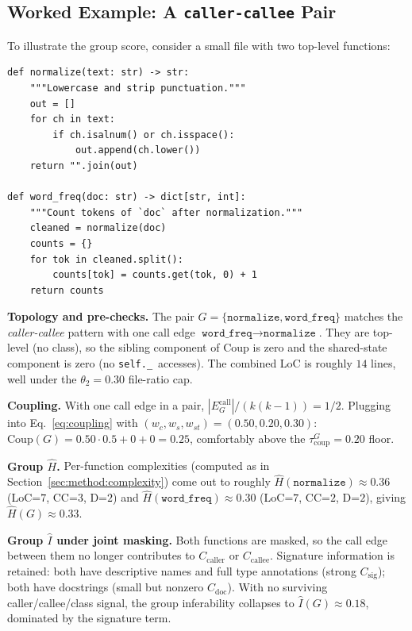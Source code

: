 \subsection{Worked Example: A \texttt{caller-callee} Pair}
\label{app:algo:groups_example}

To illustrate the group score, consider a small file with two
top-level functions:

\begin{center}\small
\begin{minipage}{0.82\linewidth}
\begin{verbatim}
def normalize(text: str) -> str:
    """Lowercase and strip punctuation."""
    out = []
    for ch in text:
        if ch.isalnum() or ch.isspace():
            out.append(ch.lower())
    return "".join(out)

def word_freq(doc: str) -> dict[str, int]:
    """Count tokens of `doc` after normalization."""
    cleaned = normalize(doc)
    counts = {}
    for tok in cleaned.split():
        counts[tok] = counts.get(tok, 0) + 1
    return counts
\end{verbatim}
\end{minipage}
\end{center}

\textbf{Topology and pre-checks.} The pair
$G\!=\!\{\texttt{normalize}, \texttt{word\_freq}\}$ matches the
\emph{caller-callee} pattern with one call edge
$\texttt{word\_freq}\!\to\!\texttt{normalize}$. They are top-level
(no class), so the sibling component of $\mathrm{Coup}$ is zero and
the shared-state component is zero (no \texttt{self.\_}~accesses). The
combined LoC is roughly $14$ lines, well under the $\theta_2\!=\!0.30$
file-ratio cap.

\textbf{Coupling.} With one call edge in a pair,
$|E^{\text{call}}_G|/(k(k\!-\!1))=1/2$. Plugging into
Eq.~\ref{eq:coupling} with $(w_c,w_s,w_{st})=(0.50,0.20,0.30)$:
$\mathrm{Coup}(G)=0.50\cdot 0.5+0+0=0.25$, comfortably above the
$\tau^G_{\mathrm{coup}}=0.20$ floor.

\textbf{Group $\hat{H}$.} Per-function complexities (computed as in
Section~\ref{sec:method:complexity}) come out to roughly
$\hat{H}(\texttt{normalize})\!\approx\!0.36$ (LoC=$7$, CC=$3$, D=$2$)
and $\hat{H}(\texttt{word\_freq})\!\approx\!0.30$ (LoC=$7$, CC=$2$,
D=$2$), giving $\hat{H}(G)\!\approx\!0.33$.

\textbf{Group $\hat{I}$ under joint masking.} Both functions are
masked, so the call edge between them no longer contributes to
$C_{\mathrm{caller}}$ or $C_{\mathrm{callee}}$. Signature information
is retained: both have descriptive names and full type annotations
(strong $C_{\mathrm{sig}}$); both have docstrings (small but nonzero
$C_{\mathrm{doc}}$). With no surviving caller/callee/class signal, the
group inferability collapses to $\hat{I}(G)\!\approx\!0.18$, dominated
by the signature term.

